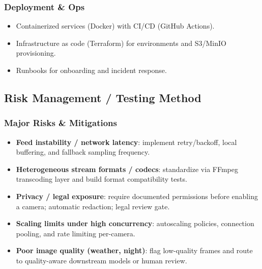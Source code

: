 \subsubsection{Deployment \& Ops}
\begin{itemize}
  \item Containerized services (Docker) with CI/CD (GitHub Actions).
  \item Infrastructure as code (Terraform) for environments and S3/MinIO provisioning.
  \item Runbooks for onboarding and incident response.
\end{itemize}

\subsection{Risk Management / Testing Method}
\subsubsection{Major Risks \& Mitigations}
\begin{itemize}
  \item \textbf{Feed instability / network latency}: implement retry/backoff, local buffering, and fallback sampling frequency.
  \item \textbf{Heterogeneous stream formats / codecs}: standardize via FFmpeg transcoding layer and build format compatibility tests.
  \item \textbf{Privacy / legal exposure}: require documented permissions before enabling a camera; automatic redaction; legal review gate.
  \item \textbf{Scaling limits under high concurrency}: autoscaling policies, connection pooling, and rate limiting per-camera.
  \item \textbf{Poor image quality (weather, night)}: flag low-quality frames and route to quality-aware downstream models or human review.
\end{itemize}

